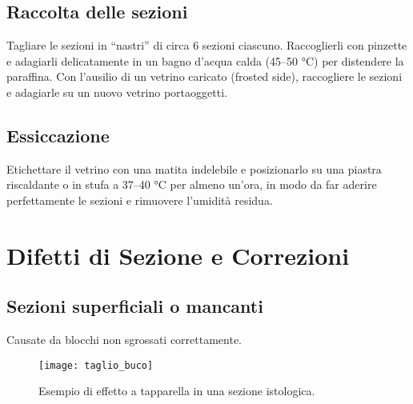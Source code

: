\subsection{Raccolta delle sezioni}

Tagliare le sezioni in “nastri” di circa 6 sezioni ciascuno. Raccoglierli con pinzette e adagiarli delicatamente in un bagno d'acqua calda (45–50 °C) per distendere la paraffina. Con l'ausilio di un vetrino caricato (frosted side), raccogliere le sezioni e adagiarle su un nuovo vetrino portaoggetti.


\subsection{Essiccazione}

Etichettare il vetrino con una matita indelebile e posizionarlo su una piastra riscaldante o in stufa a 37–40 °C per almeno un'ora, in modo da far aderire perfettamente le sezioni e rimuovere l'umidità residua.




\section{Difetti di Sezione e Correzioni}

\subsection{Sezioni superficiali o mancanti}
Causate da blocchi non sgrossati correttamente.

\begin{figure}[h]
\centering  
\texttt{[image: taglio\_buco]}
\caption{Esempio di effetto a tapparella in una sezione istologica.}
\end{figure}

